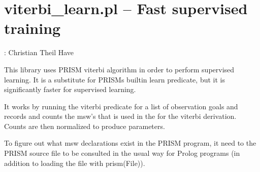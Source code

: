 


\section{viterbi_learn.pl -- Fast supervised training}

\label{sec:viterbilearn}

\begin{tags}
: Christian Theil Have
\end{tags}

This library uses PRISM viterbi algorithm in order to perform supervised learning.
It is a substitute for PRISMs builtin learn predicate, but it is significantly faster
for supervised learning.

It works by running the viterbi predicate for a list of observation goals and records
and counts the msw's that is used in the for the viterbi derivation. Counts are then
normalized to produce parameters.

To figure out what msw declarations exist in the PRISM program, it need to the PRISM
source file to be consulted in the usual way for Prolog programs (in addition to
loading the file with prism(File)).\vspace{0.7cm}

